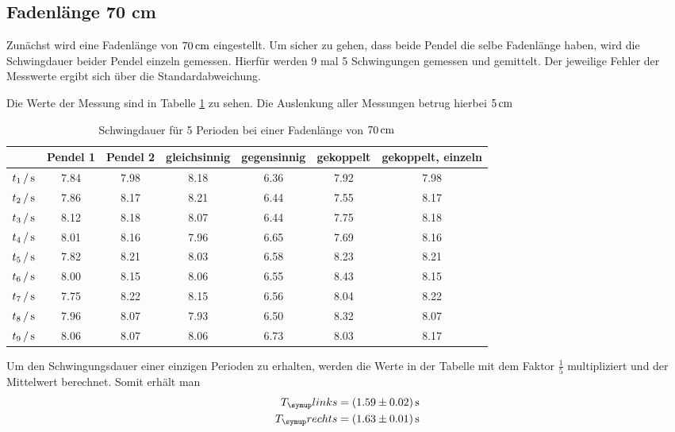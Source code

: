 \subsection{Fadenlänge 70 cm}

Zunächst wird eine Fadenlänge von $70\,\si{\centi\meter}$ eingestellt. Um sicher zu gehen, dass
beide Pendel die selbe Fadenlänge haben, wird die Schwingdauer beider Pendel
einzeln gemessen. Hierfür werden 9 mal 5 Schwingungen gemessen und gemittelt.
Der jeweilige Fehler der Messwerte ergibt sich über die Standardabweichung.

Die Werte der Messung sind in Tabelle \ref{tab:70cm} zu sehen. Die Auslenkung
aller Messungen betrug hierbei $5\,\si{\centi\meter}$
\begin{table}[H]
  \centering
  \begin{tabular}{c | c c c c c c}
    \toprule
    &Pendel 1& Pendel 2 & gleichsinnig & gegensinnig &gekoppelt&
    gekoppelt, einzeln \\
    \midrule
    $t_1\,/\,\si{\second}$ & 7.84 & 7.98 & 8.18 & 6.36 & 7.92 & 7.98 \\
    $t_2\,/\,\si{\second}$ & 7.86 & 8.17 & 8.21 & 6.44 & 7.55 & 8.17 \\
    $t_3\,/\,\si{\second}$ & 8.12 & 8.18 & 8.07 & 6.44 & 7.75 & 8.18 \\
    $t_4\,/\,\si{\second}$ & 8.01 & 8.16 & 7.96 & 6.65 & 7.69 & 8.16 \\
    $t_5\,/\,\si{\second}$ & 7.82 & 8.21 & 8.03 & 6.58 & 8.23 & 8.21 \\
    $t_6\,/\,\si{\second}$ & 8.00 & 8.15 & 8.06 & 6.55 & 8.43 & 8.15 \\
    $t_7\,/\,\si{\second}$ & 7.75 & 8.22 & 8.15 & 6.56 & 8.04 & 8.22 \\
    $t_8\,/\,\si{\second}$ & 7.96 & 8.07 & 7.93 & 6.50 & 8.32 & 8.07 \\
    $t_9\,/\,\si{\second}$ & 8.06 & 8.07 & 8.06 & 6.73 & 8.03 & 8.17 \\
    \bottomrule
  \end{tabular}
  \caption{Schwingdauer für 5 Perioden bei einer Fadenlänge von $70\,\si{\centi\meter}$}
  \label{tab:70cm}
\end{table}
Um den Schwingungsdauer einer einzigen Perioden zu erhalten, werden die Werte
in der Tabelle mit dem Faktor $\frac{1}{5}$ multipliziert und der Mittelwert
berechnet. Somit erhält man
\begin{align*}
T_\su{links}&=(1.59\pm0.02)\sek \\
T_\su{rechts}&=(1.63\pm0.01)\sek
\end{align*}
